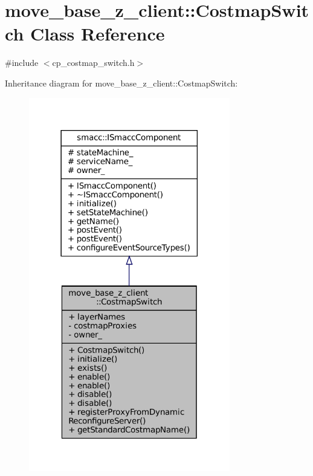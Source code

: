 \hypertarget{classmove__base__z__client_1_1CostmapSwitch}{}\section{move\+\_\+base\+\_\+z\+\_\+client\+:\+:Costmap\+Switch Class Reference}
\label{classmove__base__z__client_1_1CostmapSwitch}


{\ttfamily \#include $<$cp\+\_\+costmap\+\_\+switch.\+h$>$}



Inheritance diagram for move\+\_\+base\+\_\+z\+\_\+client\+:\+:Costmap\+Switch\+:
\nopagebreak
\begin{figure}[H]
\begin{center}
\leavevmode
\includegraphics[width=249pt]{classmove__base__z__client_1_1CostmapSwitch__inherit__graph}
\end{center}
\end{figure}


